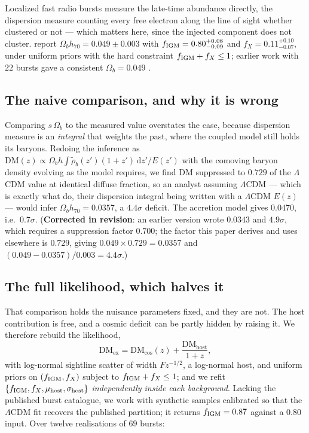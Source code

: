 \documentclass[11pt,a4paper]{article}
\begin{document}
Localized fast radio bursts measure the late-time abundance directly, the dispersion measure
counting every free electron along the line of sight whether clustered or not --- which matters
here, since the injected component does not cluster. \citet{Connor2025} report
$\Omega_b h_{70} = 0.049 \pm 0.003$ with $f_{\rm IGM} = 0.80^{+0.08}_{-0.09}$ and
$f_X = 0.11^{+0.10}_{-0.07}$, under uniform priors with the hard constraint
$f_{\rm IGM} + f_X \leq 1$; earlier work with $22$ bursts gave a consistent
$\Omega_b = 0.049$ \citep{Yang2022}.

\subsection{The naive comparison, and why it is wrong}
Comparing $s\,\Omega_b$ to the measured value overstates the case, because dispersion measure is an
\emph{integral} that weights the past, where the coupled model still holds its baryons. Redoing the
inference as
$\mathrm{DM}(z) \propto \Omega_b h \int \tilde\rho_b(z')(1+z')\,\mathrm{d}z'/E(z')$ with the
comoving baryon density evolving as the model requires, we find $\mathrm{DM}$ suppressed to
$0.729$ of the $\Lambda$CDM value at identical diffuse fraction, so an analyst assuming
$\Lambda$CDM --- which is exactly what \citet{Connor2025} do, their dispersion integral being
written with a $\Lambda$CDM $E(z)$ --- would infer $\Omega_b h_{70} = 0.0357$, a $4.4\sigma$
deficit. The accretion model gives $0.0470$, i.e.\ $0.7\sigma$. (\textbf{Corrected in revision}: an earlier version wrote $0.0343$ and $4.9\sigma$, which requires a suppression factor $0.700$; the factor this paper derives and uses elsewhere is $0.729$, giving $0.049 \times 0.729 = 0.0357$ and $(0.049-0.0357)/0.003 = 4.4\sigma$.)

\subsection{The full likelihood, which halves it}
That comparison holds the nuisance parameters fixed, and they are not. The host contribution is
free, and a cosmic deficit can be partly hidden by raising it. We therefore rebuild the likelihood,
\begin{equation}
\mathrm{DM_{ex}} = \mathrm{DM_{cos}}(z) + \frac{\mathrm{DM_{host}}}{1+z},
\end{equation}
with log-normal sightline scatter of width $F z^{-1/2}$, a log-normal host, and uniform priors on
$(f_{\rm IGM}, f_X)$ subject to $f_{\rm IGM}+f_X \leq 1$; and we refit
$\{f_{\rm IGM}, f_X, \mu_{\rm host}, \sigma_{\rm host}\}$ \emph{independently inside each
background}. Lacking the published burst catalogue, we work with synthetic samples calibrated so
that the $\Lambda$CDM fit recovers the published partition; it returns $f_{\rm IGM} = 0.87$ against
a $0.80$ input. Over twelve realisations of $69$ bursts:
\end{document}
